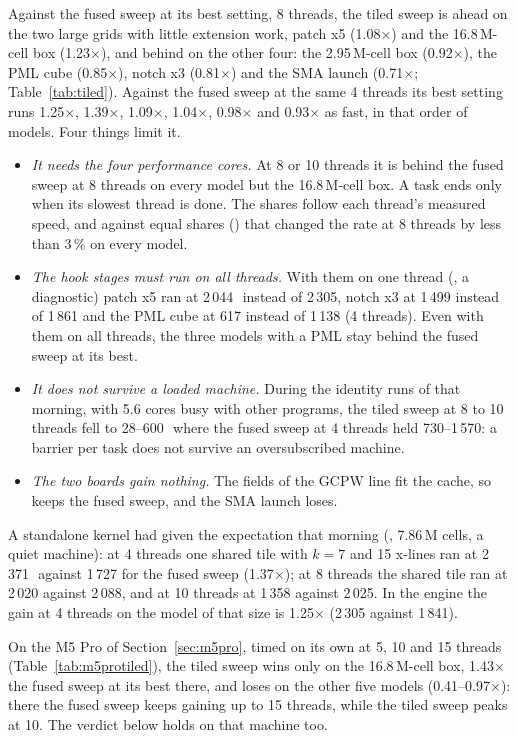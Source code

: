 Against the fused sweep at its best setting, 8 threads, the tiled sweep is ahead on the two large grids with little
extension work, patch x5 (1.08$\times$) and the 16.8\,M-cell box (1.23$\times$), and behind on the other four: the
2.95\,M-cell box (0.92$\times$), the PML cube (0.85$\times$), notch x3 (0.81$\times$) and the SMA launch
(0.71$\times$; Table~\ref{tab:tiled}). Against the fused sweep at the same 4 threads its best setting runs
1.25$\times$, 1.39$\times$, 1.09$\times$, 1.04$\times$, 0.98$\times$ and 0.93$\times$ as fast, in that order of
models. Four things limit it.
\begin{itemize}
\item \emph{It needs the four performance cores.} At 8 or 10 threads it is behind the fused sweep at 8 threads on
  every model but the 16.8\,M-cell box. A task ends only when its slowest thread is done. The shares follow each
  thread's measured speed, and against equal shares () that changed the rate at 8 threads
  by less than 3\,\% on every model.
\item \emph{The hook stages must run on all threads.} With them on one thread (, a
  diagnostic) patch x5 ran at 2\,044\,\MC\ instead of 2\,305, notch x3 at 1\,499 instead of 1\,861 and the PML cube
  at 617 instead of 1\,138 (4 threads). Even with them on all threads, the three models with a PML stay behind the
  fused sweep at its best.
\item \emph{It does not survive a loaded machine.} During the identity runs of that morning, with 5.6 cores busy
  with other programs, the tiled sweep at 8 to 10 threads fell to 28--600\,\MC\ where the fused sweep at 4 threads
  held 730--1\,570: a barrier per task does not survive an oversubscribed machine.
\item \emph{The two boards gain nothing.} The fields of the GCPW line fit the cache, so  keeps the fused
  sweep, and the SMA launch loses.
\end{itemize}
A standalone kernel had given the expectation that morning (, 7.86\,M cells, a
quiet machine): at 4 threads one shared tile with $k=7$ and 15 x-lines ran at 2\,371\,\MC\ against 1\,727 for the
fused sweep (1.37$\times$); at 8 threads the shared tile ran at 2\,020 against 2\,088, and at 10 threads at 1\,358
against 2\,025. In the engine the gain at 4 threads on the model of that size is 1.25$\times$ (2\,305 against
1\,841).

On the M5 Pro of Section~\ref{sec:m5pro}, timed on its own at 5, 10 and 15 threads (Table~\ref{tab:m5protiled}),
the tiled sweep wins only on the 16.8\,M-cell box, 1.43$\times$ the fused sweep at its best there, and loses on the
other five models (0.41--0.97$\times$): there the fused sweep keeps gaining up to 15 threads, while the tiled sweep
peaks at 10. The verdict below holds on that machine too.

